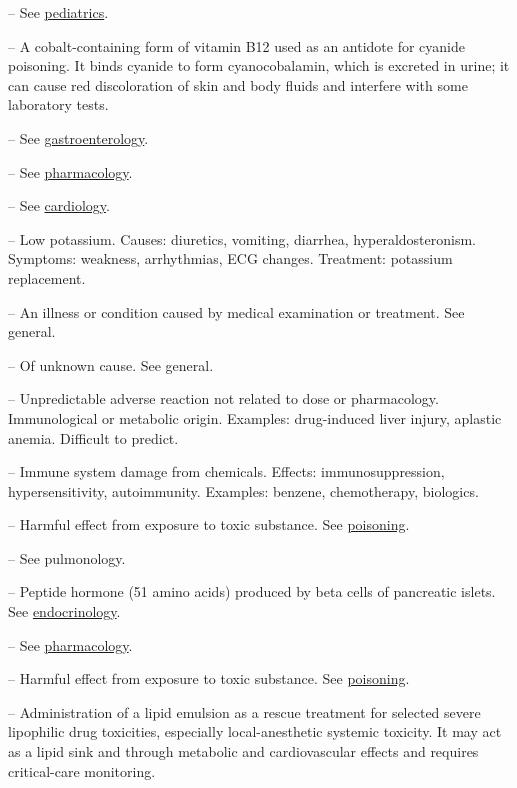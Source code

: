 -- See \hyperlink{Pediatrics}{pediatrics}.

-- A cobalt-containing form of vitamin B12 used as an antidote for cyanide poisoning. It binds cyanide to form cyanocobalamin, which is excreted in urine; it can cause red discoloration of skin and body fluids and interfere with some laboratory tests.

-- See \hyperlink{Gastroenterology}{gastroenterology}.

-- See \hyperlink{Pharmacology}{pharmacology}.

-- See \hyperlink{Cardiology}{cardiology}.

-- Low potassium. Causes: diuretics, vomiting, diarrhea, hyperaldosteronism. Symptoms: weakness, arrhythmias, ECG changes. Treatment: potassium replacement.

-- An illness or condition caused by medical examination or treatment. See general.

-- Of unknown cause. See general.

-- Unpredictable adverse reaction not related to dose or pharmacology. Immunological or metabolic origin. Examples: drug-induced liver injury, aplastic anemia. Difficult to predict.

-- Immune system damage from chemicals. Effects: immunosuppression, hypersensitivity, autoimmunity. Examples: benzene, chemotherapy, biologics.

-- Harmful effect from exposure to toxic substance. See \hyperlink{Poisoning}{poisoning}.

-- See pulmonology.

-- Peptide hormone (51 amino acids) produced by beta cells of pancreatic islets. See \hyperlink{Endocrinology}{endocrinology}.

-- See \hyperlink{Pharmacology}{pharmacology}.

-- Harmful effect from exposure to toxic substance. See \hyperlink{Poisoning}{poisoning}.

-- Administration of a lipid emulsion as a rescue treatment for selected severe lipophilic drug toxicities, especially local-anesthetic systemic toxicity. It may act as a lipid sink and through metabolic and cardiovascular effects and requires critical-care monitoring.

